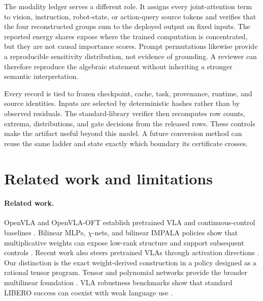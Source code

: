 \documentclass{article}
\begin{document}
The modality ledger serves a different role. It assigns every joint-attention term to vision,
instruction, robot-state, or action-query source tokens and verifies that the four reconstructed
groups sum to the deployed output on fixed inputs. The reported energy shares expose where the
trained computation is concentrated, but they are not causal importance scores. Prompt permutations
likewise provide a reproducible sensitivity distribution, not evidence of grounding. A reviewer can
therefore reproduce the algebraic statement without inheriting a stronger semantic interpretation.

Every record is tied to frozen checkpoint, cache, task, provenance, runtime, and source identities.
Inputs are selected by deterministic hashes rather than by observed residuals. The standard-library
verifier then recomputes row counts, extrema, distributions, and gate decisions from the released
rows. These controls make the artifact useful beyond this model. A future conversion method can
reuse the same ladder and state exactly which boundary its certificate crosses.

\section{Related work and limitations}

\paragraph{Related work.}
OpenVLA and OpenVLA-OFT establish pretrained VLA and continuous-control baselines
\cite{openvla,openvlaoft}. Bilinear MLPs, $\chi$-nets, and bilinear IMPALA policies show that
multiplicative weights can expose low-rank structure and support subsequent controls
\cite{pearce,chinets,bimpala}. Recent work also steers pretrained VLAs through activation
directions \cite{haonsteering}. Our distinction is the exact weight-derived construction in a
policy designed as a rational tensor program. Tensor and polynomial networks provide the broader
multilinear foundation \cite{koldabader,stoudenmire,chrysos}. VLA robustness benchmarks show
that standard LIBERO success can coexist with weak language use
\cite{liberopro,liberocf,liberopara}.
\end{document}
